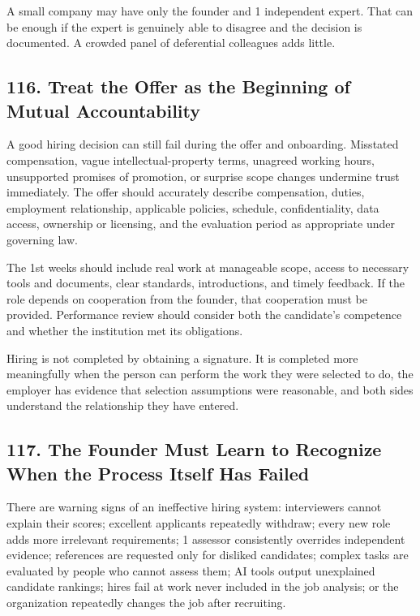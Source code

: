 A small company may have only the founder and 1 independent expert. That can be enough if the expert is genuinely able to disagree and the decision is documented. A crowded panel of deferential colleagues adds little.

\subsection*{116. Treat the Offer as the Beginning of Mutual Accountability}

A good hiring decision can still fail during the offer and onboarding. Misstated compensation, vague intellectual-property terms, unagreed working hours, unsupported promises of promotion, or surprise scope changes undermine trust immediately. The offer should accurately describe compensation, duties, employment relationship, applicable policies, schedule, confidentiality, data access, ownership or licensing, and the evaluation period as appropriate under governing law.

The 1st weeks should include real work at manageable scope, access to necessary tools and documents, clear standards, introductions, and timely feedback. If the role depends on cooperation from the founder, that cooperation must be provided. Performance review should consider both the candidate's competence and whether the institution met its obligations.

Hiring is not completed by obtaining a signature. It is completed more meaningfully when the person can perform the work they were selected to do, the employer has evidence that selection assumptions were reasonable, and both sides understand the relationship they have entered.

\subsection*{117. The Founder Must Learn to Recognize When the Process Itself Has Failed}

There are warning signs of an ineffective hiring system: interviewers cannot explain their scores; excellent applicants repeatedly withdraw; every new role adds more irrelevant requirements; 1 assessor consistently overrides independent evidence; references are requested only for disliked candidates; complex tasks are evaluated by people who cannot assess them; AI tools output unexplained candidate rankings; hires fail at work never included in the job analysis; or the organization repeatedly changes the job after recruiting.

